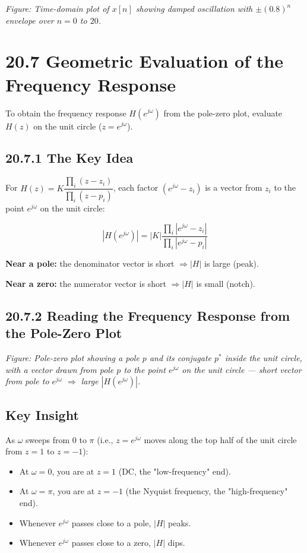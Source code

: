 \documentclass[11pt]{article}
\begin{document}
\textit{Figure: Time-domain plot of $x[n]$ showing damped oscillation with $\pm (0.8)^n$ envelope over $n = 0$ to $20$.}

\section*{20.7 Geometric Evaluation of the Frequency Response}

To obtain the frequency response $H(e^{j\omega})$ from the pole-zero plot, evaluate $H(z)$ on the unit circle ($z = e^{j\omega}$).

\subsection*{20.7.1 The Key Idea}

For $H(z) = K \dfrac{\prod_i (z - z_i)}{\prod_i (z - p_i)}$, each factor $(e^{j\omega} - z_i)$ is a vector from $z_i$ to the point $e^{j\omega}$ on the unit circle:

\[|H(e^{j\omega})| = |K| \frac{\prod_i |e^{j\omega} - z_i|}{\prod_i |e^{j\omega} - p_i|}\]

\textbf{Near a pole:} the denominator vector is short $\Rightarrow |H|$ is large (peak).

\textbf{Near a zero:} the numerator vector is short $\Rightarrow |H|$ is small (notch).

\subsection*{20.7.2 Reading the Frequency Response from the Pole-Zero Plot}

\textit{Figure: Pole-zero plot showing a pole $p$ and its conjugate $p^*$ inside the unit circle, with a vector drawn from pole $p$ to the point $e^{j\omega}$ on the unit circle — short vector from pole to $e^{j\omega}$ $\Rightarrow$ large $|H(e^{j\omega})|$.}

\subsection*{Key Insight}

As $\omega$ sweeps from $0$ to $\pi$ (i.e., $z = e^{j\omega}$ moves along the top half of the unit circle from $z = 1$ to $z = -1$):

\begin{itemize}
  \item At $\omega = 0$, you are at $z = 1$ (DC, the "low-frequency" end).
  \item At $\omega = \pi$, you are at $z = -1$ (the Nyquist frequency, the "high-frequency" end).
  \item Whenever $e^{j\omega}$ passes close to a pole, $|H|$ peaks.
  \item Whenever $e^{j\omega}$ passes close to a zero, $|H|$ dips.
\end{itemize}
\end{document}
